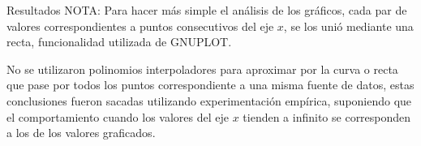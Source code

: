 \begin{section}{Resultados}
	NOTA: 
	Para hacer más simple el análisis de los gráficos, cada par de valores correspondientes a puntos consecutivos del eje $x$, se los unió mediante una recta, funcionalidad utilizada de GNUPLOT.
	
	No se utilizaron polinomios interpoladores para aproximar por la curva o recta que pase por todos los puntos correspondiente a una misma fuente de datos, estas conclusiones fueron sacadas utilizando experimentación empírica, suponiendo que el comportamiento cuando los valores del eje $x$ tienden a infinito se corresponden a los de los valores graficados.

\end{section}
